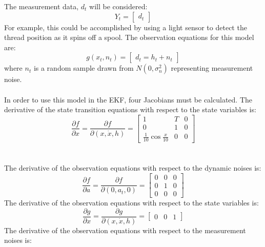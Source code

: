 \documentclass[12pt]{article}
\begin{document}
The measurement data, $d_t$ will be considered:
\begin{equation}
Y_t = \begin{bmatrix}
d_t
\end{bmatrix}
\end{equation}
\indent
For example, this could be accomplished by using a light sensor to detect the thread position as it spins off a spool. The observation equations for this model are:
\begin{equation}
g(x_t,n_t) = \begin{bmatrix}
d_t = h_t + n_t
\end{bmatrix}
\end{equation}
\indent
where $n_t$ is a random sample drawn from $N(0,\sigma_n^2)$ representing measurement noise. \\
\\ \indent
In order to use this model in the EKF, four Jacobians must be calculated. The derivative of the state transition equations with respect to the state variables is: 
\begin{equation}
\frac{\partial f}{\partial x} =
\frac{\partial f}{\partial (x,\dot{x},h)} =
\begin{bmatrix}
1 & T & 0  \\
0 & 1 & 0  \\
\frac{1}{10} \cos \frac{x}{10} & 0 & 0 
\end{bmatrix}
\label{eq: Dfx}
\end{equation} \\
\\ \indent
The derivative of the observation equations with respect to the dynamic noises is:
\begin{equation}
\frac{\partial f}{\partial a} =
\frac{\partial f}{\partial (0,a_t,0)} =
\begin{bmatrix}
0 & 0 & 0  \\
0 & 1 & 0  \\
0 & 0 & 0 
\end{bmatrix} 
\label{eq: Dfa}
\end{equation}
\indent
The derivative of the observation equations with respect to the state variables is:
\begin{equation}
\frac{\partial g}{\partial x} =
\frac{\partial g}{\partial (x,\dot{x},h)} =
\begin{bmatrix}
0 & 0 & 1
\end{bmatrix}
\label{eq: Dgx}
\end{equation}
\indent
The derivative of the observation equations with respect to the measurement noises is:
\end{document}
